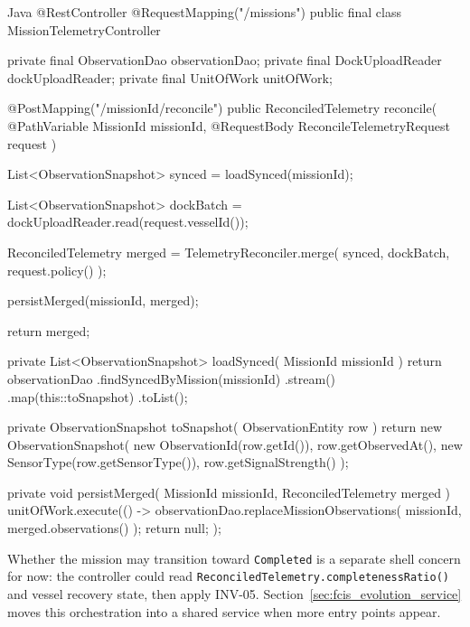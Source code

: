 \begin{ridercode}{Java}
@RestController
@RequestMapping("/missions")
public final class MissionTelemetryController
{
    private final ObservationDao observationDao;
    private final DockUploadReader dockUploadReader;
    private final UnitOfWork unitOfWork;

    @PostMapping("/{missionId}/reconcile")
    public ReconciledTelemetry reconcile(
        @PathVariable MissionId missionId,
        @RequestBody ReconcileTelemetryRequest request
    )
    {
        List<ObservationSnapshot> synced =
            loadSynced(missionId);

        List<ObservationSnapshot> dockBatch =
            dockUploadReader.read(request.vesselId());

        ReconciledTelemetry merged =
            TelemetryReconciler.merge(
                synced,
                dockBatch,
                request.policy()
            );

        persistMerged(missionId, merged);

        return merged;
    }

    private List<ObservationSnapshot> loadSynced(
        MissionId missionId
    )
    {
        return observationDao
            .findSyncedByMission(missionId)
            .stream()
            .map(this::toSnapshot)
            .toList();
    }

    private ObservationSnapshot toSnapshot(
        ObservationEntity row
    )
    {
        return new ObservationSnapshot(
            new ObservationId(row.getId()),
            row.getObservedAt(),
            new SensorType(row.getSensorType()),
            row.getSignalStrength()
        );
    }

    private void persistMerged(
        MissionId missionId,
        ReconciledTelemetry merged
    )
    {
        unitOfWork.execute(() ->
        {
            observationDao.replaceMissionObservations(
                missionId,
                merged.observations()
            );
            return null;
        });
    }
}
\end{ridercode}
\label{lst:fcis-reconciliation-shell}

Whether the mission may transition toward \texttt{Completed} is a separate shell concern for now: the controller could read \texttt{ReconciledTelemetry.completenessRatio()} and vessel recovery state, then apply INV-05. Section~\ref{sec:fcis_evolution_service} moves this orchestration into a shared service when more entry points appear.

